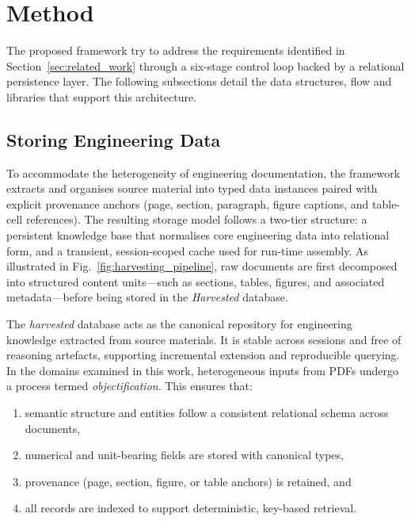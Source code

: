 \documentclass[largeformat]{interact}
\begin{document}
\section{Method}
\label{sec:Method}
The proposed framework try to address the requirements identified in Section~\ref{sec:related_work} through a six-stage control loop backed by a relational persistence layer. The following subsections detail the data structures, flow and libraries that support this architecture.

\subsection{Storing Engineering Data}
\label{subsec:storing_engineering_data}
To accommodate the heterogeneity of engineering documentation, the framework extracts and organises source material into typed data instances paired with explicit provenance anchors (page, section, paragraph, figure captions, and table-cell references). The resulting storage model follows a two-tier structure: a persistent knowledge base that normalises core engineering data into relational form, and a transient, session-scoped cache used for run-time assembly. As illustrated in Fig.~\ref{fig:harvesting_pipeline}, raw documents are first decomposed into structured content units—such as sections, tables, figures, and associated metadata—before being stored in the \emph{Harvested} database.
 
The \textit{harvested} database acts as the canonical repository for engineering knowledge extracted from source materials. It is stable across sessions and free of reasoning artefacts, supporting incremental extension and reproducible querying. In the domains examined in this work, heterogeneous inputs from PDFs undergo a process termed \emph{objectification}. This ensures that:
\begin{enumerate}[label=(\alph*)]
    \item semantic structure and entities follow a consistent relational schema across documents,
    \item numerical and unit-bearing fields are stored with canonical types,
    \item provenance (page, section, figure, or table anchors) is retained, and
    \item all records are indexed to support deterministic, key-based retrieval.
\end{enumerate}
\end{document}
